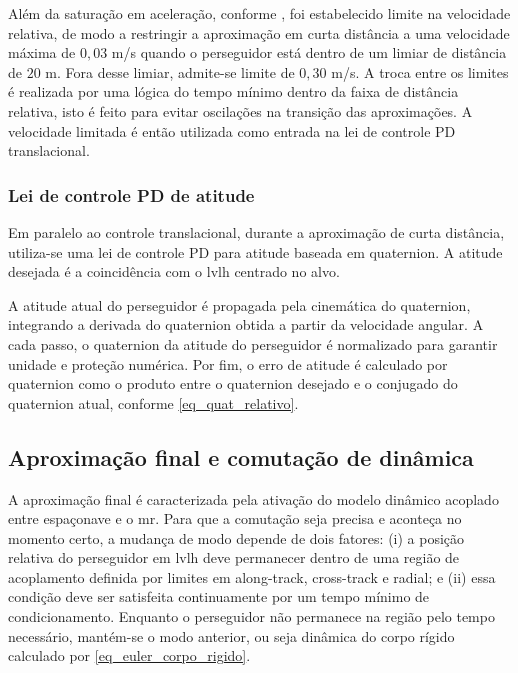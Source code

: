Além da saturação em aceleração, conforme \cite{vedant2025longrange}, foi estabelecido limite na velocidade relativa, de modo a restringir a aproximação em curta distância a uma velocidade máxima de $0{,}03$ m/s quando o perseguidor está dentro de um limiar de distância de $20$ m. Fora desse limiar, admite-se limite de $0{,}30$ m/s.
A troca entre os limites é realizada por uma lógica do tempo mínimo dentro da faixa de distância relativa, isto é feito para evitar oscilações na transição das aproximações.
A velocidade limitada é então utilizada como entrada na lei de controle PD translacional.

\subsubsection{Lei de controle PD de atitude}
\label{subsubsec_lei_pd_atitude_quaternion}

Em paralelo ao controle translacional, durante a aproximação de curta distância, utiliza-se uma lei de controle PD para atitude baseada em quaternion.
A atitude desejada é a coincidência com o \gls{lvlh} centrado no alvo.

A atitude atual do perseguidor é propagada pela cinemática do quaternion, integrando a derivada do quaternion obtida a partir da velocidade angular.
A cada passo, o quaternion da atitude do perseguidor é normalizado para garantir unidade e proteção numérica.
Por fim, o erro de atitude é calculado por quaternion como o produto entre o quaternion desejado e o conjugado do quaternion atual, conforme \ref{eq_quat_relativo}.


\subsection{Aproximação final e comutação de dinâmica}
\label{subsec_aprox_final_comutacao_dinamica}

A aproximação final é caracterizada pela ativação do modelo dinâmico acoplado entre espaçonave e o \gls{mr}.
Para que a comutação seja precisa e aconteça no momento certo, a mudança de modo depende de dois fatores:
(i) a posição relativa do perseguidor em \gls{lvlh} deve permanecer dentro de uma região de acoplamento definida por limites em along-track, cross-track e radial; 
e (ii) essa condição deve ser satisfeita continuamente por um tempo mínimo de condicionamento.
Enquanto o perseguidor não permanece na região pelo tempo necessário, mantém-se o modo anterior, ou seja dinâmica do corpo rígido calculado por \ref{eq_euler_corpo_rigido}.


